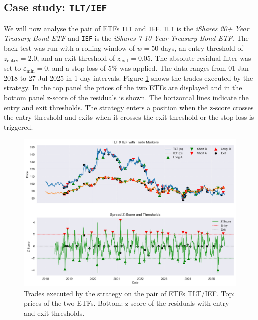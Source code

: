 \documentclass{article}
\begin{document}
\subsection{Case study: \texttt{TLT/IEF}}
We will now analyse the pair of ETFs \texttt{TLT} and \texttt{IEF}. \texttt{TLT} is the \textit{iShares 20+ Year Treasury Bond ETF} and \texttt{IEF} is the \textit{iShares 7-10 Year Treasury Bond ETF}. The back-test was run with a rolling window of $w=50$ days, an entry threshold of $z_{\mathrm{entry}}=2.0$, and an exit threshold of $z_{\mathrm{exit}}=0.05$. The absolute residual filter was set to $\varepsilon_{\min}=0$, and a stop-loss of 5\% was applied. The data ranges from 01 Jan 2018 to 27 Jul 2025 in 1 day intervals. \newline
Figure \ref{fig:trades_tlt_ief} shows the trades executed by the strategy. In the top panel the prices of the two ETFs are displayed and in the bottom panel z-score of the residuals is shown. The horizontal lines indicate the entry and exit thresholds. The strategy enters a position when the z-score crosses the entry threshold and exits when it crosses the exit threshold or the stop-loss is triggered.

\begin{figure}[htbp]
\centering
\includegraphics[width=\linewidth]{tlt_ief_trades.png}
\caption{Trades executed by the strategy on the pair of ETFs TLT/IEF. Top: prices of the two ETFs. Bottom: z-score of the residuals with entry and exit thresholds.}
\label{fig:trades_tlt_ief}
\end{figure}
\end{document}
